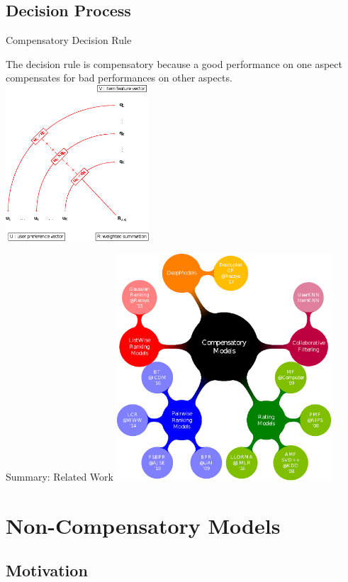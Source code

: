 \documentclass[xcolor=dvipsnames]{beamer}
\begin{document}
\subsection{Decision Process}

\begin{frame}{Compensatory Decision Rule}

\alert{The decision rule is compensatory because a good performance on one aspect compensates for bad performances on other aspects.}
\centering 
    \includegraphics[width=0.4\textwidth]{presentation.eps}



\end{frame}

\begin{frame}{Summary: Related Work}
\centering
    \includegraphics[width=0.6\textwidth]{mindmap.eps}
\end{frame}
\section{Non-Compensatory Models}

\subsection{Motivation}
\end{document}
